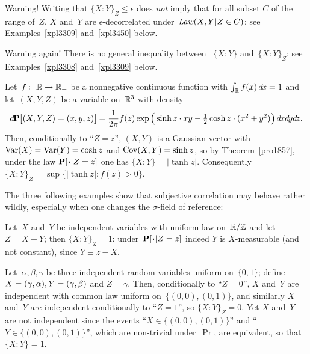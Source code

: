 \begin{Rmk}\label{r4670}
Warning! Writing that ${\{X:Y\}}_Z \leq \epsilon$ does \emph{not} imply
that for all subset $C$ of the range of~$Z$,
$X$ and~$Y$ are $\epsilon$-decorrelated under~$\operatorname{\mathit{Law}}(X,Y|\allowbreak Z\in C)$:
see Examples~\ref{xpl3309} and~\ref{xpl3450} below.
\end{Rmk}

\begin{Rmk}
Warning again! There is no general inequality between~%
${\{X:Y\}}$ and~${\{X:Y\}}_Z$: see Examples~\ref{xpl3308} and~\ref{xpl3309} below.
\end{Rmk}

\begin{Xpl}
Let~$f \colon \RR \to \RR_+$ be a nonnegative continuous function
with $\int_{\RR} f(x)\,\dx{x} = 1$ and let~$(X,Y,Z)$ be a variable
on~$\mathbb{R}^3$ with density
\[ \dx\Pr\big[(X,Y,Z)=(x,y,z)\big] = \frac{1}{2\pi} f(z)
\exp\Big( \sinh z\cdot xy - {\textstyle\frac{1}{2}} \cosh z\cdot(x^2+y^2) \Big) \,\dx{x}\dx{y}\dx{z} .\]
Then, conditionally to ``$Z=z$'', $(X,Y)$ is a Gaussian vector
with $\operatorname{Var}(X) = \operatorname{Var}(Y) = \cosh z$ and $\operatorname{Cov}(X,Y) = \sinh z$,
so by Theorem~\ref{pro1857}, under the law $\Pr[\Bcdot|Z=z]$ one has ${\{X:Y\}} = |\tanh z|$.
Consequently ${\{X:Y\}}_Z = \sup\{ |\tanh z| \colon f(z)>0 \}$.
\end{Xpl}

The three following examples show that subjective correlation may behave rather wildly,
especially when one changes the $\sigma$-field of reference:
%
\begin{Xpl}\label{xpl3308}
Let~$X$ and~$Y$ be independent variables with uniform law on~$\mathbb{R}/\mathbb{Z}$
and let~$Z=X+Y$; then ${\{X:Y\}}_{Z} = 1$: under~$\Pr[\Bcdot|\ab Z=z]$ indeed
$Y$ is $X$-measurable (and not constant), since $Y\equiv z-X$.
\end{Xpl}

\begin{Xpl}\label{xpl3309}
Let~$\alpha,\beta,\gamma$ be three independent random variables
uniform on~$\{0,1\}$; define ${X=(\gamma,\alpha)}, \allowbreak Y=(\gamma,\beta)$ and $Z=\gamma$.
Then, conditionally to ``$Z=0$'', $X$ and~$Y$ are independent
with common law uniform on~$\{(0,0),(0,1)\}$,
and similarly $X$ and~$Y$ are independent conditionally to ``$Z=1$'',
so ${\{X:Y\}}_Z=0$.
Yet $X$ and~$Y$ are not independent
since the events ``$X\in\{(0,0),(0,1)\}$'' and ``$Y\in\{(0,0),(0,1)\}$'',
which are non-trivial under~$\Pr$, are equivalent,
so that ${\{X:Y\}}=1$.
\end{Xpl}

